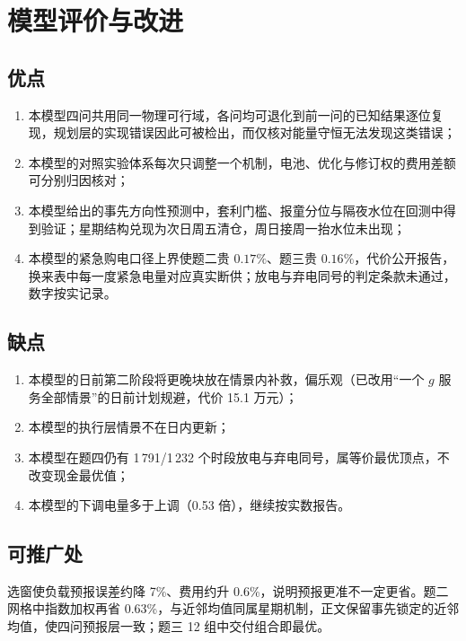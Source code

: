\documentclass[12pt,a4paper]{ctexart}
\begin{document}
\section{模型评价与改进}

\subsection{优点}

\begin{enumerate}
  \item 本模型四问共用同一物理可行域，各问均可退化到前一问的已知结果逐位复现，规划层的实现错误因此可被检出，而仅核对能量守恒无法发现这类错误；
  \item 本模型的对照实验体系每次只调整一个机制，电池、优化与修订权的费用差额可分别归因核对；
  \item 本模型给出的事先方向性预测中，套利门槛、报童分位与隔夜水位在回测中得到验证；星期结构兑现为次日周五清仓，周日接周一抬水位未出现；
  \item 本模型的紧急购电口径上界使题二贵 $0.17\%$、题三贵 $0.16\%$，代价公开报告，换来表中每一度紧急电量对应真实断供；放电与弃电同号的判定条款未通过，数字按实记录。
\end{enumerate}

\subsection{缺点}

\begin{enumerate}
  \item 本模型的日前第二阶段将更晚块放在情景内补救，偏乐观（已改用“一个 $g$ 服务全部情景”的日前计划规避，代价 15.1 万元）；
  \item 本模型的执行层情景不在日内更新；
  \item 本模型在题四仍有 1\,791/1\,232 个时段放电与弃电同号，属等价最优顶点，不改变现金最优值；
  \item 本模型的下调电量多于上调（0.53 倍），继续按实数报告。
\end{enumerate}

\subsection{可推广处}

选窗使负载预报误差约降 7\%、费用约升 0.6\%，说明预报更准不一定更省。题二网格中指数加权再省 0.63\%，与近邻均值同属星期机制，正文保留事先锁定的近邻均值，使四问预报层一致；题三 12 组中交付组合即最优。
\end{document}
